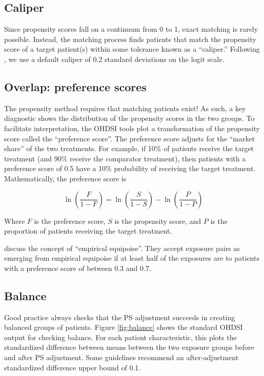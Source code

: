 \documentclass[11pt]{book}
\begin{document}
\subsection{Caliper}\label{caliper}

Since propensity scores fall on a continuum from 0 to 1, exact matching
is rarely possible. Instead, the matching process finds patients that
match the propensity score of a target patient(s) within some tolerance
known as a ``caliper.'' Following \citet{austin_2011}, we use a default
caliper of 0.2 standard deviations on the logit scale.

\subsection{Overlap: preference scores}\label{overlap-preference-scores}

The propensity method requires that matching patients exist! As such, a
key diagnostic shows the distribution of the propensity scores in the
two groups. To facilitate interpretation, the OHDSI tools plot a
transformation of the propensity score called the ``preference score''.
\citep{walker_2013} The preference score adjusts for the ``market
share'' of the two treatments. For example, if 10\% of patients receive
the target treatment (and 90\% receive the comparator treatment), then
patients with a preference score of 0.5 have a 10\% probability of
receiving the target treatment. Mathematically, the preference score is

\[\ln\left(\frac{F}{1-F}\right)=\ln\left(\frac{S}{1-S}\right)-\ln\left(\frac{P}{1-P}\right)\]

Where \(F\) is the preference score, \(S\) is the propensity score, and
\(P\) is the proportion of patients receiving the target treatment.

\citet{walker_2013} discuss the concept of ``empirical equipoise''. They
accept exposure pairs as emerging from empirical equipoise if at least
half of the exposures are to patients with a preference score of between
0.3 and 0.7.

\subsection{Balance}\label{balance}

Good practice always checks that the PS adjustment succeeds in creating
balanced groups of patients. Figure \ref{fig:balance} shows the standard
OHDSI output for checking balance. For each patient characteristic, this
plots the standardized difference between means between the two exposure
groups before and after PS adjustment. Some guidelines recommend an
after-adjustment standardized difference upper bound of 0.1.
\citep{rubin_2001}
\end{document}
